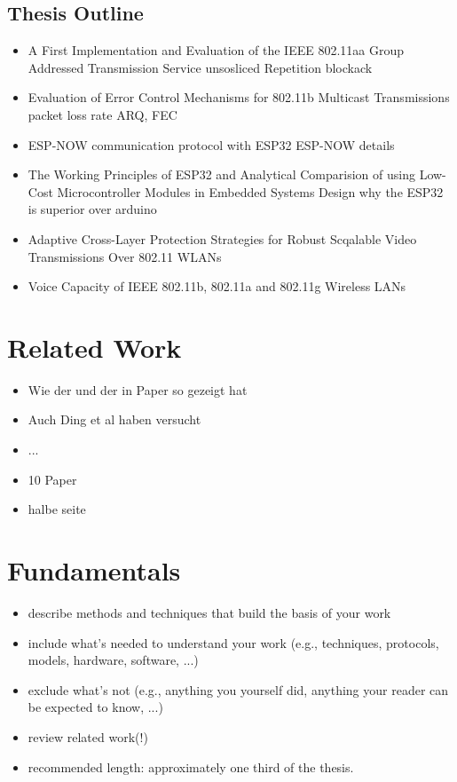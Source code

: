 \documentclass[]{ccs-thesis}
\begin{document}
\section{Thesis Outline}
\begin{itemize}
	\item A First Implementation and Evaluation of the IEEE 802.11aa Group Addressed Transmission Service    
		\subitem unsosliced Repetition
		\subitem blockack
	\item Evaluation of Error Control Mechanisms for 802.11b Multicast Transmissions
		\subitem packet loss rate
		\subitem ARQ, FEC
	\item ESP-NOW communication protocol with ESP32
		\subitem ESP-NOW details
	\item The Working Principles of ESP32 and Analytical Comparision of using Low-Cost Microcontroller Modules in Embedded Systems Design
		\subitem why the ESP32 is superior over arduino
	\item Adaptive Cross-Layer Protection Strategies for Robust Scqalable Video Transmissions Over 802.11 WLANs
	\item Voice Capacity of IEEE 802.11b, 802.11a and 802.11g Wireless LANs
\end{itemize}

\chapter{Related Work}
\begin{itemize}
	\item Wie der und der in Paper so gezeigt hat 
	\item Auch Ding et al haben versucht
	\item ...
	\item 10 Paper
	\item halbe seite
\end{itemize}

\chapter{Fundamentals}
\label{sec:fundamentals}

\begin{itemize}
	\item describe methods and techniques that build the basis of your work
	\item include what's needed to understand your work (e.g., techniques, protocols, models, hardware, software, ...)
	\item exclude what's not (e.g., anything you yourself did, anything your reader can be expected to know, ...)
	\item review related work(!)
	\item recommended length: approximately one third of the thesis.
\end{itemize}
\end{document}
